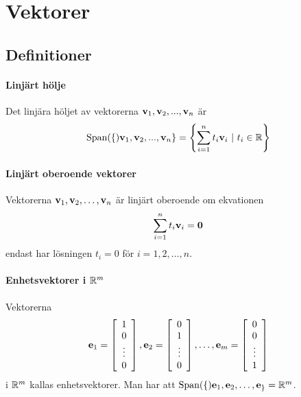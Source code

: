 \section{Vektorer}

\subsection{Definitioner}

\paragraph{Linjärt hölje}
Det linjära höljet av vektorerna $\vectorbold{v}_1, \vectorbold{v}_2, ..., \vectorbold{v}_n$ är
\begin{align*}
	\Span\{\vectorbold{v}_1, \vectorbold{v}_2, ..., \vectorbold{v}_n\} = \left\{\sum\limits_{i = 1}^{n} t_i\vectorbold{v}_i\ |\ t_i\in\R \right\}
\end{align*}

\paragraph{Linjärt oberoende vektorer}
Vektorerna $\vect{v}_1, \vect{v}_2, \dots, \vect{v}_n$ är linjärt oberoende om ekvationen
\begin{align*}
	\sum\limits_{i = 1}^{n}t_i\vect{v}_i = \vect{0}
\end{align*}
endast har lösningen $t_i = 0$ för $i = 1, 2, \dots, n$.

\paragraph{Enhetsvektorer i $\mathbb{R}^m$}
Vektorerna
\begin{align*}
	\vect{e}_1 =
	\left[\begin{array}{c}
    	1    \\
    	0    \\
    	\vdots \\
	    0
	\end{array}\right]
	, \vect{e}_2 =
	\left[\begin{array}{c}
    	0    \\
    	1    \\
    	\vdots \\
	    0
	\end{array}\right]
	, \dots, \vect{e}_m =
	\left[\begin{array}{c}
    	0    \\
    	0    \\
    	\vdots \\
	    1
	\end{array}\right]
\end{align*}
i $\mathbb{R}^m$ kallas enhetsvektorer. Man har att $\Span\{\vect{e}_1, \vect{e}_2, \dots, \vect{e}_\} = \R^{m}$.

